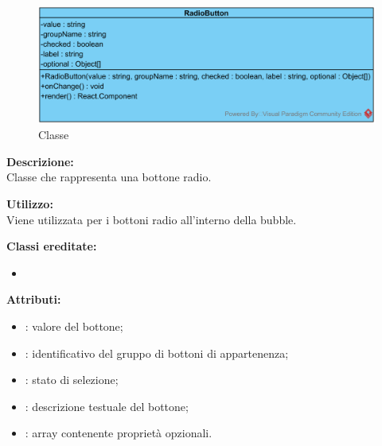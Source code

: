 \paragraph[::RadioButton]{\class}\mbox{}\\ \label{\class}
\begin{figure}[H]
	\centering
	\includegraphics[width=14cm]{./diagrammi/framework/view/gui/radiobutton.png}
	\caption{Classe \class}
\end{figure}
\textbf{Descrizione:}\\
Classe che rappresenta una bottone radio.

\textbf{Utilizzo:}\\
Viene utilizzata per i bottoni radio all'interno della bubble.

\textbf{Classi ereditate:}
\begin{itemize}
	\item {}
\end{itemize}


\textbf{Attributi:}
\begin{itemize}
	\item {}: valore del bottone;
	\item {}: identificativo del gruppo di bottoni di appartenenza;
	\item {}: stato di selezione;
	\item {}: descrizione testuale del bottone;
	\item {}: array contenente proprietà opzionali.
\end{itemize}

